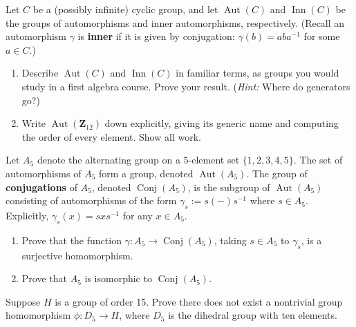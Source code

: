 \documentclass[11pt,twoside,openany]{memoir}
\begin{document}
            \begin{exercise}
            Let $C$ be a (possibly infinite) cyclic group, and let $\operatorname{Aut}(C)$ and $\operatorname{Inn}(C)$ be the groups of automorphisms and inner automorphisms, respectively. (Recall an automorphism $\gamma$ is \textbf{inner} if it is given by conjugation: $\gamma(b)=aba^{-1}$ for some $a\in C$.)
            \begin{enumerate}[label = (\arabic*)]
                \item Describe $\operatorname{Aut}(C)$ and $\operatorname{Inn}(C)$ in familiar terms, as groups you would study in a first algebra course. Prove your result. (\textit{Hint:} Where do generators go?)
                \item Write $\operatorname{Aut}(\mathbf{Z}_{12})$ down explicitly, giving its generic name and computing the order of every element. Show all work.
            \end{enumerate}
            \end{exercise}
            
            \newpage
            \begin{exercise}
            Let $A_5$ denote the alternating group on a $5$-element set $\{1,2,3,4,5\}$. The set of automorphisms of $A_5$ form a group, denoted $\operatorname{Aut}(A_5)$. The group of \textbf{conjugations} of $A_5$, denoted $\operatorname{Conj}(A_5)$, is the subgroup of $\operatorname{Aut}(A_5)$ consisting of automorphisms of the form $\gamma_s:=s(-)s^{-1}$ where $s\in A_5$. Explicitly, $\gamma_s(x)=sxs^{-1}$ for any $x\in A_5$.
            \begin{enumerate}[label = (\arabic*)]
                \item Prove that the function $\gamma:A_5\to \operatorname{Conj}(A_5)$, taking $s\in A_5$ to $\gamma_s$, is a surjective homomorphism.
                \item Prove that $A_5$ is isomorphic to $\operatorname{Conj}(A_5)$.
            \end{enumerate}
            \end{exercise}
            
            \begin{exercise}
            Suppose $H$ is a group of order 15. Prove there does not exist a nontrivial group homomorphism $\phi:D_5\to H$, where $D_5$ is the dihedral group with ten elements.
            \end{exercise}
            
\end{document}
